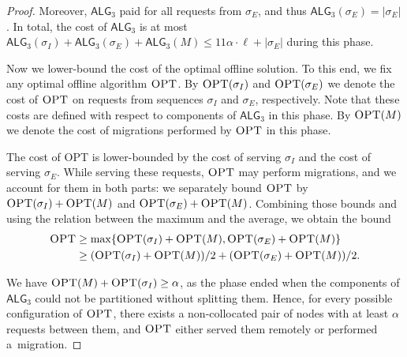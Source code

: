 \documentclass[a4paper,anonymous,USenglish]{lipics-v2019}
\newcommand{\OPT}{\textsc{OPT}\xspace}
\newcommand{\TAlg}{{\ensuremath{\textsf{ALG}_{3}}}\xspace}
\newcommand\maciek[1]{\color{brown}\textbf{(Maciek: #1)}\color{black}}
\begin{document}
\begin{proof}
	
	Moreover, \TAlg paid for all requests from $\sigma_E$, and thus $\TAlg(\sigma_E) = |\sigma_E|$.
	In total, the cost of \TAlg is at most $\TAlg(\sigma_I) + \TAlg(\sigma_E) + \TAlg(M) \leq 11\alpha\cdot \ell + |\sigma_E|$ during this phase.
	
	\medskip
	
	Now we lower-bound the cost of the optimal offline solution.
	To this end, we fix any optimal offline algorithm $\OPT$.
	By $\OPT(\sigma_I)$ and $\OPT(\sigma_E)$ we denote the cost of $\OPT$ on requests from sequences $\sigma_I$ and $\sigma_E$, respectively.
	Note that these costs are defined with respect to components of \TAlg in this phase.
	By $\OPT(M)$ we denote the cost of migrations performed by $\OPT$ in this phase.
	
	The cost of \OPT is lower-bounded by the cost of serving $\sigma_I$ and the cost of serving $\sigma_E$.
	While serving these requests, $\OPT$ may perform migrations, and we account for them in both parts: we separately bound $\OPT$ by $\OPT(\sigma_I) + \OPT(M)$ and $\OPT(\sigma_E) + \OPT(M)$.
	Combining those bounds and using the relation between the maximum and the average, we obtain the bound
	\begin{align*}
		\OPT&\geq \max\{\OPT(\sigma_I) + \OPT(M), \OPT(\sigma_E) + \OPT(M)\}\\
		&\geq (\OPT(\sigma_I) + \OPT(M)) / 2 + (\OPT(\sigma_E) + \OPT(M)) / 2.
	\end{align*}
	
	
	We have $\OPT(M) + \OPT(\sigma_I) \geq \alpha$, as the phase ended when the components of \TAlg{} could not be partitioned without splitting them.
	Hence, for every possible configuration of $\OPT$, there exists a non-collocated pair of nodes with at least $\alpha$ requests between them, and
	$\OPT$ either served them remotely or performed a~migration.
	

\end{proof}
\end{document}
